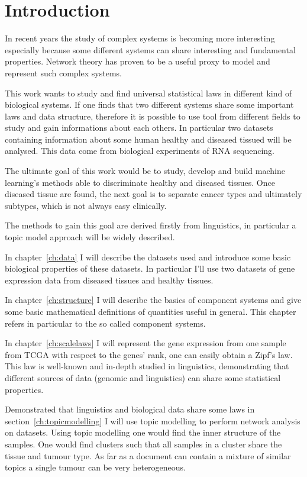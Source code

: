 \chapter{Introduction}\label{ch:intro}
In recent years the study of complex systems is becoming more interesting 
especially because some different systems can share interesting and fundamental 
properties. Network theory has proven to be a useful proxy to model and represent such complex 
systems.

This work wants to study and find universal statistical laws in different kind of biological systems.
If one finds that two different systems share some important laws and data structure, therefore it is possible to use tool from different fields 
to study and gain informations about each others. 
In particular two datasets containing information about some human healthy and 
diseased tissued will be analysed. This data come from biological experiments of 
RNA sequencing.

The ultimate goal of this work would be to study, develop and build machine learning's methods able to 
discriminate healthy and diseased tissues. Once diseased tissue are found, the 
next goal is to separate cancer types and ultimately subtypes, which is not 
always easy clinically.

The methods to gain this goal are derived firstly from linguistics, in 
particular a topic model approach will be widely described.

In chapter~\ref{ch:data} I will describe the datasets used and introduce some 
basic biological properties of these datasets. In particular I'll use two datasets of gene expression data from 
diseased tissues and healthy tissues.

In chapter~\ref{ch:structure} I will describe the basics of component systems 
and give some basic mathematical definitions of quantities useful in general. 
This chapter refers in particular to the so called component systems.

In chapter~\ref{ch:scalelaws} I will represent the gene expression from one sample from TCGA 
with respect to the genes' rank, one can easily obtain a Zipf's law. This law is 
well-known and in-depth studied in linguistics, demonstrating that different sources of data (genomic and linguistics) 
can share some statistical properties.

Demonstrated that linguistics and biological data share some laws in section~\ref{ch:topicmodelling} 
I will use topic modelling to perform network analysis on datasets.
Using topic modelling one would find the inner structure of the samples.
One would find clusters such that all samples in a cluster share the tissue and tumour type.
As far as a document can contain a mixture of similar topics a single tumour can be very heterogeneous.

